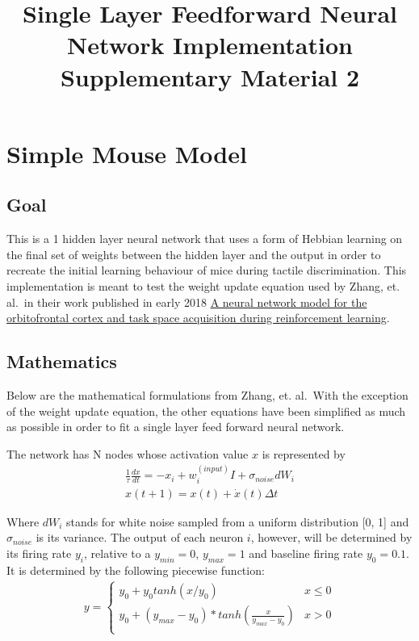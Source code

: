 \documentclass[11pt]{article}
\title{Single Layer Feedforward Neural Network Implementation \\ Supplementary Material 2}
\begin{document}
    
    
    \maketitle
    
    

    
    \hypertarget{simple-mouse-model}{%
\section{Simple Mouse Model}\label{simple-mouse-model}}

\hypertarget{goal}{%
\subsection{Goal}\label{goal}}

This is a 1 hidden layer neural network that uses a form of Hebbian
learning on the final set of weights between the hidden layer and the
output in order to recreate the initial learning behaviour of mice
during tactile discrimination. This implementation is meant to test the
weight update equation used by Zhang, et. al.~in their work published in
early 2018
\href{https://journals.plos.org/ploscompbiol/article/file?id=10.1371/journal.pcbi.1005925\&type=printable}{A
neural network model for the orbitofrontal cortex and task space
acquisition during reinforcement learning}.

\hypertarget{mathematics}{%
\subsection{Mathematics}\label{mathematics}}

Below are the mathematical formulations from Zhang, et. al.~With the
exception of the weight update equation, the other equations have been
simplified as much as possible in order to fit a single layer feed
forward neural network.

The network has N nodes whose activation value \(x\) is represented by
\begin{align}
\frac{1}{\tau} \frac{dx}{dt}= -x_i + w_i^{(input)}I + \sigma_{noise}dW_i \\
x(t + 1) = x(t) + \dot{x}(t)\Delta t
\end{align}

Where \(dW_i\) stands for white noise sampled from a uniform
distribution {[}0, 1{]} and \(\sigma_{noise}\) is its variance. The
output of each neuron \(i\), however, will be determined by its firing
rate \(y_i\), relative to a \(y_{min}=0\), \(y_{max}=1\) and baseline
firing rate \(y_0 = 0.1\). It is determined by the following piecewise
function: \begin{align}
y=   \left\{
\begin{array}{ll}
      y_0 + y_0 tanh(x/y_0) & x \leq 0   \\
      y_0 + (y_{max} - y_0)*tanh(\frac{x}{y_{max}- y_0}) & x > 0 \\
\end{array} 
\right.
\end{align}
\end{document}
